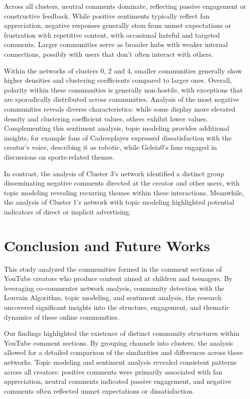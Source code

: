 \documentclass[12pt]{article}
\begin{document}
Across all clusters, neutral comments dominate, reflecting passive engagement or constructive feedback.
While positive sentiments typically reflect fan appreciation, 
negative responses generally stem from unmet expectations or frustration with repetitive content, with 
occasional hateful and targeted comments. 
Larger communities serve as broader hubs with weaker internal connections,
possibly with users that don't often interact with others.

Within the networks of clusters 0, 2 and 4, smaller communities generally show higher densities and 
clustering coefficients compared to larger ones. Overall, polarity within these communities is generally 
non-hostile, with exceptions that are sporadically distributed across communities. 
Analysis of the most negative communities reveals diverse characteristics: 
while some display more elevated density and clustering coefficient values, 
others exhibit lower values. Complementing this sentiment analysis, topic modeling provides additional insights,
for example fans of Cadresplayer expressed dissatisfaction with the creator's voice, 
describing it as robotic, while Geleia0's fans engaged in discussions on sports-related themes.

In contrast, the analysis of Cluster 3's network identified a distinct group disseminating negative 
comments directed at the creator and other users, with topic modeling revealing recurring themes within 
these interactions. Meanwhile, the analysis of Cluster 1's network with topic modeling highlighted 
potential indicators of direct or implicit advertising.

\section{Conclusion and Future Works}

This study analyzed the communities formed in the comment sections of YouTube creators who produce 
content aimed at children and teenagers. By leveraging co-commenter network analysis, community detection 
with the Louvain Algorithm, topic modeling, and sentiment analysis, the research uncovered significant 
insights into the structure, engagement, and thematic dynamics of these online communities.

Our findings highlighted the existence of distinct community structures within YouTube comment sections. 
By grouping channels into clusters, the analysis allowed for a detailed comparison of the similarities 
and differences across these networks. Topic modeling and sentiment analysis revealed consistent 
patterns across all creators: positive comments were primarily associated with fan appreciation, 
neutral comments indicated passive engagement, and negative comments often reflected unmet expectations 
or dissatisfaction. 
\end{document}
